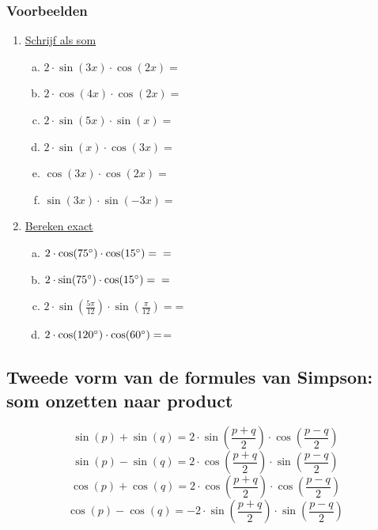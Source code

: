 \documentclass[a4paper,12pt]{article}
\begin{document}
\subsubsection*{Voorbeelden}

\begin{enumerate}[(1)]
  \item\underline{Schrijf als som}
    \begin{enumerate}[(a)]
      \item $2\cdot \sin(3x)\cdot \cos(2x)= $\dotfill
      \item $2\cdot \cos(4x)\cdot \cos(2x)= $\dotfill
      \item $2\cdot \sin(5x)\cdot \sin(x)= $\dotfill
      \item $2\cdot \sin(x)\cdot \cos(3x)= $\dotfill
      \item $\cos(3x)\cdot \cos(2x)= $\dotfill
      \item $\sin(3x)\cdot \sin(-3x)= $\dotfill
    \end{enumerate}
  \item \underline{Bereken exact}
    \begin{enumerate}[(a)]
      \item $2\cdot \cos(75\degree)\cdot \cos(15\degree) = \dotfill \newline =$\dotfill
      \item $2\cdot \sin(75\degree)\cdot \cos(15\degree) = \dotfill \newline =$\dotfill
      \item $2\cdot \sin(\frac{5\pi}{12})\cdot \sin(\frac{\pi}{12}) = $\dotfill \newline =\dotfill
      \item $2\cdot \cos(120^\circ)\cdot \cos(60^\circ) = $\dotfill \newline =\dotfill
    \end{enumerate}
\end{enumerate}

\newpage
\subsection{Tweede vorm van de formules van Simpson: som onzetten naar product}
\[\sin(p)+\sin(q)=2\cdot \sin(\frac{p+q}{2})\cdot \cos(\frac{p-q}{2})
\]
\[\sin(p)-\sin(q)=2\cdot \cos(\frac{p+q}{2})\cdot \sin(\frac{p-q}{2})
\]
\[\cos(p)+\cos(q)=2\cdot \cos(\frac{p+q}{2})\cdot \cos(\frac{p-q}{2})
\]
\[\cos(p)-\cos(q)=-2\cdot \sin(\frac{p+q}{2})\cdot \sin(\frac{p-q}{2})
\]
\end{document}

